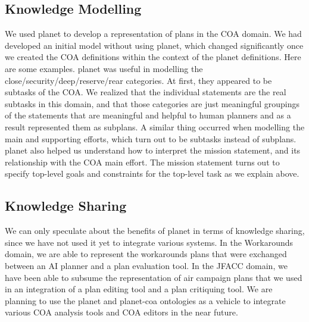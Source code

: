 \subsection{Knowledge Modelling}

We used {\sc planet} to develop a representation of plans in 
the COA domain.%
We had developed an initial model without using {\sc planet}, 
which changed significantly once we created the COA
definitions within the context of the {\sc planet} definitions.
Here are some examples.
{\sc planet} was useful in modelling the 
close/security/deep/reserve/rear categories.  
At first, they appeared to be subtasks of the COA.  
We realized that the individual statements 
are the real subtasks in this domain, and that those categories 
are just meaningful groupings of the statements that are meaningful and helpful
to human planners and as a result represented them as subplans.
A similar thing occurred when modelling the main and supporting 
efforts, which turn out to be subtasks instead of subplans.
{\sc planet} also helped us understand 
how to interpret the mission 
statement, and its relationship with the COA main effort.
The mission statement turns out to specify 
top-level goals and constraints for the top-level task 
as we explain above.


\subsection{Knowledge Sharing}

We can only speculate about the benefits of {\sc planet} in terms of 
knowledge sharing, since we have not used it yet to integrate 
various systems.  
In the Workarounds domain, we are able to represent
the workarounds plans that were exchanged between an AI planner
and a plan evaluation tool.  
In the JFACC domain, we have been able to subsume the 
representation of air campaign plans that we used in an integration 
of a plan editing tool and a plan critiquing tool.
We are planning to use the {\sc planet} and {\sc planet-coa} ontologies as a 
vehicle to integrate various COA analysis tools and COA editors
in the near future.


